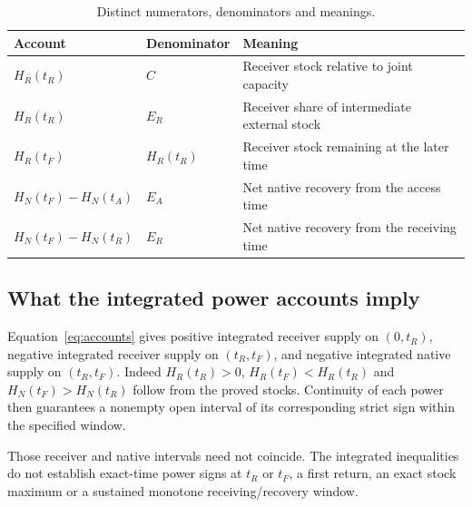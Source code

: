 \begin{table}[ht]
\centering
\caption{Distinct numerators, denominators and meanings.}\label{tab:accounts}
\renewcommand{\arraystretch}{1.12}
\begin{tabularx}{\textwidth}{@{}lYY@{}}
\toprule
Account & Denominator & Meaning\\\midrule
$H_R(t_R)$ & $C$ & Receiver stock relative to joint capacity\\
$H_R(t_R)$ & $E_R$ & Receiver share of intermediate external stock\\
$H_R(t_F)$ & $H_R(t_R)$ & Receiver stock remaining at the later time\\
$H_N(t_F)-H_N(t_A)$ & $E_A$ & Net native recovery from the access time\\
$H_N(t_F)-H_N(t_R)$ & $E_R$ & Net native recovery from the receiving time\\
\bottomrule
\end{tabularx}
\end{table}

\subsection{What the integrated power accounts imply}\label{sec:signs}
Equation~\eqref{eq:accounts} gives positive integrated receiver supply on $(0,t_R)$, negative integrated receiver supply on $(t_R,t_F)$, and negative integrated native supply on $(t_R,t_F)$. Indeed $H_R(t_R)>0$, $H_R(t_F)<H_R(t_R)$ and $H_N(t_F)>H_N(t_R)$ follow from the proved stocks. Continuity of each power then guarantees a nonempty open interval of its corresponding strict sign within the specified window.

Those receiver and native intervals need not coincide. The integrated inequalities do not establish exact-time power signs at $t_R$ or $t_F$, a first return, an exact stock maximum or a sustained monotone receiving/recovery window.
